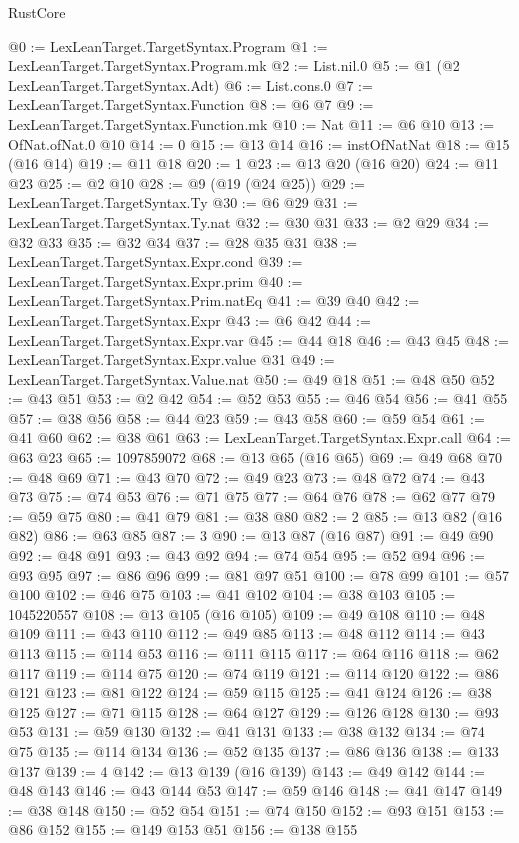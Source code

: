 \begin{lexlean}{RustCore}
\begin{coremodule}
@0 := LexLeanTarget.TargetSyntax.Program
@1 := LexLeanTarget.TargetSyntax.Program.mk
@2 := List.nil.{0}
@5 := @1 (@2 LexLeanTarget.TargetSyntax.Adt)
@6 := List.cons.{0}
@7 := LexLeanTarget.TargetSyntax.Function
@8 := @6 @7
@9 := LexLeanTarget.TargetSyntax.Function.mk
@10 := Nat
@11 := @6 @10
@13 := OfNat.ofNat.{0} @10
@14 := 0
@15 := @13 @14
@16 := instOfNatNat
@18 := @15 (@16 @14)
@19 := @11 @18
@20 := 1
@23 := @13 @20 (@16 @20)
@24 := @11 @23
@25 := @2 @10
@28 := @9 (@19 (@24 @25))
@29 := LexLeanTarget.TargetSyntax.Ty
@30 := @6 @29
@31 := LexLeanTarget.TargetSyntax.Ty.nat
@32 := @30 @31
@33 := @2 @29
@34 := @32 @33
@35 := @32 @34
@37 := @28 @35 @31
@38 := LexLeanTarget.TargetSyntax.Expr.cond
@39 := LexLeanTarget.TargetSyntax.Expr.prim
@40 := LexLeanTarget.TargetSyntax.Prim.natEq
@41 := @39 @40
@42 := LexLeanTarget.TargetSyntax.Expr
@43 := @6 @42
@44 := LexLeanTarget.TargetSyntax.Expr.var
@45 := @44 @18
@46 := @43 @45
@48 := LexLeanTarget.TargetSyntax.Expr.value @31
@49 := LexLeanTarget.TargetSyntax.Value.nat
@50 := @49 @18
@51 := @48 @50
@52 := @43 @51
@53 := @2 @42
@54 := @52 @53
@55 := @46 @54
@56 := @41 @55
@57 := @38 @56
@58 := @44 @23
@59 := @43 @58
@60 := @59 @54
@61 := @41 @60
@62 := @38 @61
@63 := LexLeanTarget.TargetSyntax.Expr.call
@64 := @63 @23
@65 := 1097859072
@68 := @13 @65 (@16 @65)
@69 := @49 @68
@70 := @48 @69
@71 := @43 @70
@72 := @49 @23
@73 := @48 @72
@74 := @43 @73
@75 := @74 @53
@76 := @71 @75
@77 := @64 @76
@78 := @62 @77
@79 := @59 @75
@80 := @41 @79
@81 := @38 @80
@82 := 2
@85 := @13 @82 (@16 @82)
@86 := @63 @85
@87 := 3
@90 := @13 @87 (@16 @87)
@91 := @49 @90
@92 := @48 @91
@93 := @43 @92
@94 := @74 @54
@95 := @52 @94
@96 := @93 @95
@97 := @86 @96
@99 := @81 @97 @51
@100 := @78 @99
@101 := @57 @100
@102 := @46 @75
@103 := @41 @102
@104 := @38 @103
@105 := 1045220557
@108 := @13 @105 (@16 @105)
@109 := @49 @108
@110 := @48 @109
@111 := @43 @110
@112 := @49 @85
@113 := @48 @112
@114 := @43 @113
@115 := @114 @53
@116 := @111 @115
@117 := @64 @116
@118 := @62 @117
@119 := @114 @75
@120 := @74 @119
@121 := @114 @120
@122 := @86 @121
@123 := @81 @122
@124 := @59 @115
@125 := @41 @124
@126 := @38 @125
@127 := @71 @115
@128 := @64 @127
@129 := @126 @128
@130 := @93 @53
@131 := @59 @130
@132 := @41 @131
@133 := @38 @132
@134 := @74 @75
@135 := @114 @134
@136 := @52 @135
@137 := @86 @136
@138 := @133 @137
@139 := 4
@142 := @13 @139 (@16 @139)
@143 := @49 @142
@144 := @48 @143
@146 := @43 @144 @53
@147 := @59 @146
@148 := @41 @147
@149 := @38 @148
@150 := @52 @54
@151 := @74 @150
@152 := @93 @151
@153 := @86 @152
@155 := @149 @153 @51
@156 := @138 @155

\end{coremodule}
\end{lexlean}
